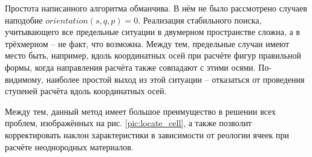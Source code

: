 Простота написанного алгоритма обманчива. В нём не было рассмотрено случаев наподобие $orientation(s, q, p) = 0$. Реализация стабильного поиска, учитывающего все предельные ситуации в двумерном пространстве сложна, а в трёхмерном -- не факт, что возможна. Между тем, предельные случаи имеют место быть, например, вдоль координатных осей при расчёте фигур правильной формы, когда направления расчёта также совпадают с этими осями. По-видимому, наиболее простой выход из этой ситуации -- отказаться от проведения ступеней расчёта вдоль координатных осей.

Между тем, данный метод имеет большое преимущество в решении всех проблем, изображённых на рис. \ref{pic:locate_cell}, а также позволит корректировать наклон характеристики в зависимости от реологии ячеек при расчёте неоднородных материалов.

















